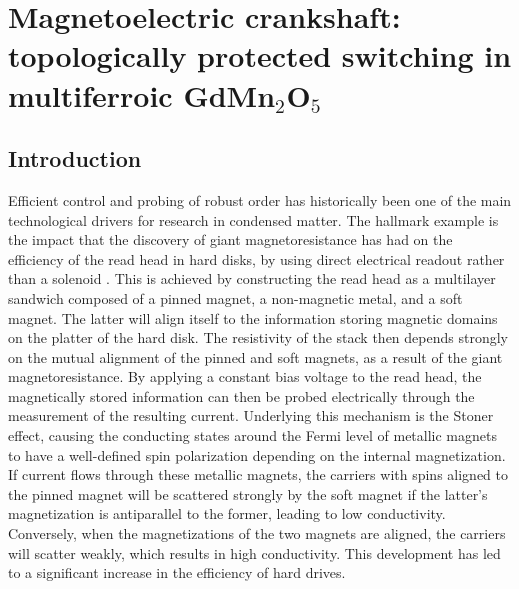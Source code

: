 \newcommand{\Jpar}{J_{||}}
\newcommand{\Jperp}{J_{\perp}}
\chapter{Magnetoelectric crankshaft: topologically protected switching in multiferroic GdMn$_2$O$_5$ \label{ch:GdMn2O5}}
\section{Introduction}
Efficient control and probing of robust order has historically been one of the main technological drivers for research in condensed matter.
The hallmark example is the impact that the discovery of giant magnetoresistance has had on the efficiency of the read head in hard disks, by using direct electrical readout rather than a solenoid \cite{Baibich1988,Binasch1989,Tsymbal2001,Nunez2006TheoryMetals,Chappert2007}.
This is achieved by constructing the read head as a multilayer sandwich composed of a pinned magnet, a non-magnetic metal, and a soft magnet.
The latter will align itself to the information storing magnetic domains on the platter of the hard disk.
The resistivity of the stack then depends strongly on the mutual alignment of the pinned and soft magnets, as a result of the giant magnetoresistance.
By applying a constant bias voltage to the read head, the magnetically stored information can then be probed electrically through the measurement of the resulting current.
Underlying this mechanism is the Stoner effect, causing the conducting states around the Fermi level of metallic magnets to have a well-defined spin polarization depending on the internal magnetization.
If current flows through these metallic magnets, the carriers with spins aligned to the pinned magnet will be scattered strongly by the soft magnet if the latter's magnetization is antiparallel to the former, leading to low conductivity.
Conversely, when the magnetizations of the two magnets are aligned, the carriers will scatter weakly, which results in high conductivity.
This development has led to a significant increase in the efficiency of hard drives.

